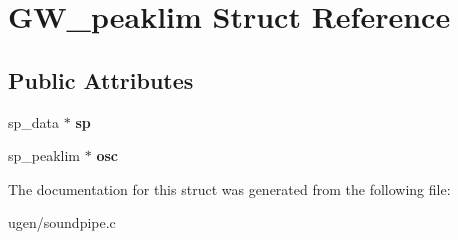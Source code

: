 \hypertarget{structGW__peaklim}{}\section{G\+W\+\_\+peaklim Struct Reference}
\label{structGW__peaklim}
\subsection*{Public Attributes}
\begin{DoxyCompactItemize}
\item 
\hypertarget{structGW__peaklim_aa58a65f4a28010423dea5fc2ab40504e}{}\label{structGW__peaklim_aa58a65f4a28010423dea5fc2ab40504e} 
sp\+\_\+data $\ast$ {\bfseries sp}
\item 
\hypertarget{structGW__peaklim_af3c59b430cd53a3ae0c594335d51948b}{}\label{structGW__peaklim_af3c59b430cd53a3ae0c594335d51948b} 
sp\+\_\+peaklim $\ast$ {\bfseries osc}
\end{DoxyCompactItemize}


The documentation for this struct was generated from the following file\+:\begin{DoxyCompactItemize}
\item 
ugen/soundpipe.\+c\end{DoxyCompactItemize}
